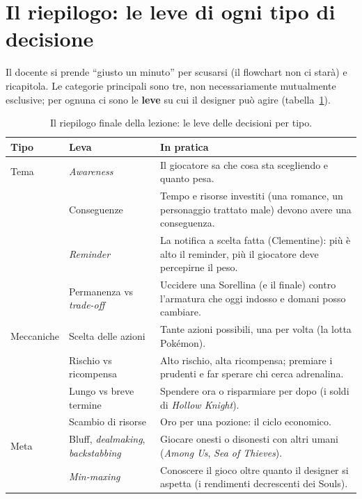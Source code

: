 \section{Il riepilogo: le leve di ogni tipo di decisione}
\label{gd15:sec:leve}



Il docente si prende ``giusto un minuto'' per scusarsi (il flowchart non ci
starà) e ricapitola. Le categorie principali sono tre, non necessariamente
mutualmente esclusive; per ognuna ci sono le \textbf{leve} su cui il
designer può agire (tabella~\ref{gd15:tab:leve}).

\begin{table}[htbp]
  \centering
  \small
  \begin{tabular}{@{}p{}p{}p{}@{}}
    \toprule
    \textbf{Tipo} & \textbf{Leva} & \textbf{In pratica} \\
    \midrule
    Tema & \emph{Awareness} & Il giocatore sa che cosa sta scegliendo e
      quanto pesa. \\
         & Conseguenze & Tempo e risorse investiti (una romance, un
      personaggio trattato male) devono avere una conseguenza. \\
         & \emph{Reminder} & La notifica a scelta fatta (Clementine): più è
      alto il reminder, più il giocatore deve percepirne il peso. \\
         & Permanenza vs \emph{trade-off} & Uccidere una Sorellina (e il
      finale) contro l'armatura che oggi indosso e domani posso cambiare. \\
    \midrule
    Meccaniche & Scelta delle azioni & Tante azioni possibili, una per
      volta (la lotta Pokémon). \\
         & Rischio vs ricompensa & Alto rischio, alta ricompensa; premiare
      i prudenti e far sperare chi cerca adrenalina. \\
         & Lungo vs breve termine & Spendere ora o risparmiare per dopo (i
      soldi di \emph{Hollow Knight}). \\
         & Scambio di risorse & Oro per una pozione: il ciclo economico. \\
    \midrule
    Meta & Bluff, \emph{dealmaking}, \emph{backstabbing} & Giocare onesti o
      disonesti con altri umani (\emph{Among Us}, \emph{Sea of Thieves}). \\
         & \emph{Min-maxing} & Conoscere il gioco oltre quanto il designer
      si aspetta (i rendimenti decrescenti dei Souls). \\
    \bottomrule
  \end{tabular}
  \caption{Il riepilogo finale della lezione: le leve delle decisioni per
  tipo.}
  \label{gd15:tab:leve}
\end{table}


